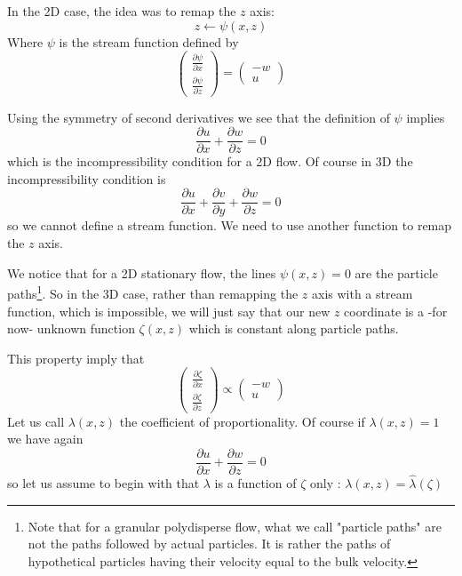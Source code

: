 \documentclass[11pt]{article}
\newcommand{\p}[2]{\ensuremath{\frac{\partial {#1}}{\partial {#2}}}}
\newcommand{\z}{\ensuremath{\zeta}}
\newcommand{\lam}{\ensuremath{\lambda}}
\begin{document}
In the 2D case, the idea was to remap the $z$ axis: 
\begin{equation}
	z \leftarrow \psi(x,z)
\end{equation}
Where $\psi$ is the stream function defined by 
\begin{equation}
	\begin{pmatrix}
	\p{\psi}{x}\\
	\p{\psi}{z} 
\end{pmatrix}
=
	\begin{pmatrix}
	-w\\
	u 
\end{pmatrix}
\end{equation}

Using the symmetry of second derivatives we see that the definition of $\psi$ implies
\begin{equation}
	\p{u}{x} + \p{w}{z} = 0
\end{equation}
which is the incompressibility condition for a 2D flow. Of course in 3D the incompressibility condition is
\begin{equation}
	\p{u}{x} + \p{v}{y} + \p{w}{z} = 0
\end{equation}
so we cannot define a stream function.
We need to use another function to remap the $z$ axis.

We notice that for a 2D stationary flow, the lines $\psi(x,z) = 0$ are the particle paths\footnote{Note that for a granular polydisperse flow, what we call "particle paths" are not the paths followed by actual particles. It is rather  the paths of hypothetical particles having their velocity equal to the bulk velocity.}.
So in the 3D case, rather than remapping the $z$ axis with a stream function, which is impossible, we will just say that our new $z$ coordinate is a -for now- unknown function $\z(x,z)$ which is constant along particle paths.

This property imply that
\begin{equation}
	\begin{pmatrix}
	\p{\z}{x}\\
	\p{\z}{z} 
\end{pmatrix}
\propto
	\begin{pmatrix}
	-w\\
	u 
\end{pmatrix}
\end{equation}
Let us call $\lam(x,z)$ the coefficient of proportionality. Of course if $\lam(x,z) = 1$ we have again
\begin{equation}
	\p{u}{x} + \p{w}{z} = 0
\end{equation}
so let us assume to begin with that $\lam$ is a function of $\zeta$ only : $\lam(x,z) = \hat{\lam}(\z)$
\end{document}
